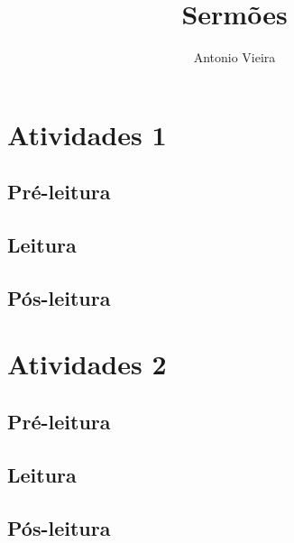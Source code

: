 \documentclass[12pt]{extarticle}
\begin{document}
\newcommand{\AutorLivro}{Antonio Vieira}
\newcommand{\TituloLivro}{Sermões}
\newcommand{\Tema}{Diálogos com a sociologia e com a antropologia}
\newcommand{\Genero}{Diário, biografia, autobiografia, relatos, memórias}
\newcommand{\imagemCapa}{./images/PNLD0003-01.png}
\newcommand{\issnppub}{---}
\newcommand{\issnepub}{---}
\newcommand{\colaborador}{\textbf{Fulano de Tal} é uma pessoa incrível e vai fazer um bom serviço.}


\title{\TituloLivro}
\author{\AutorLivro}
\def\authornotes{\colaborador}

\date{}
\maketitle
\tableofcontents




\section{Atividades 1}


\subsection{Pré-leitura}
\subsection{Leitura}
\subsection{Pós-leitura}



\section{Atividades 2}

\subsection{Pré-leitura}
\subsection{Leitura}
\subsection{Pós-leitura}

\lipsum
\end{document}
